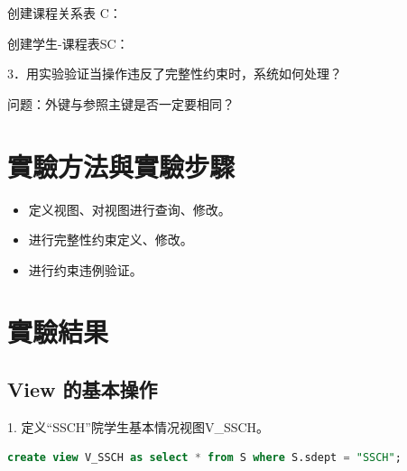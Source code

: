 \documentclass[12pt, a4paper]{report}
\begin{document}
创建课程关系表 C：

\begin{figure}[H] %
    \centering %
\end{figure}

创建学生-课程表SC：

\begin{figure}[H] %
    \centering %
\end{figure}

3．用实验验证当操作违反了完整性约束时，系统如何处理？

问题：外键与参照主键是否一定要相同？

\section{實驗方法與實驗步驟}

\begin{itemize}
    \item 定义视图、对视图进行查询、修改。
    \item 进行完整性约束定义、修改。
    \item 进行约束违例验证。
\end{itemize}

\section{實驗結果}

\subsection{View 的基本操作}

1. 定义“SSCH”院学生基本情况视图V\_SSCH。\\

\begin{lstlisting}[language=SQL]
    create view V_SSCH as select * from S where S.sdept = "SSCH";
\end{lstlisting}
\end{document}

